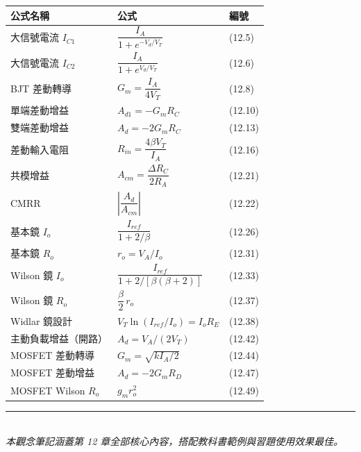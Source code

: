 \documentclass[12pt]{article}
\begin{document}
\begin{center}\small
\renewcommand{\arraystretch}{1.6}
\begin{tabular}{p{5.0cm}|l|l}
\toprule
\textbf{公式名稱} & \textbf{公式} & \textbf{編號} \\
\midrule
大信號電流 $I_{C1}$ & $\dfrac{I_A}{1+e^{-V_d/V_T}}$ & (12.5) \\[4pt]
大信號電流 $I_{C2}$ & $\dfrac{I_A}{1+e^{V_d/V_T}}$ & (12.6) \\[4pt]
BJT 差動轉導 & $G_m = \dfrac{I_A}{4V_T}$ & (12.8) \\[4pt]
單端差動增益 & $A_{d1} = -G_m R_C$ & (12.10) \\[4pt]
雙端差動增益 & $A_d = -2G_m R_C$ & (12.13) \\[4pt]
差動輸入電阻 & $R_{in} = \dfrac{4\beta V_T}{I_A}$ & (12.16) \\[4pt]
共模增益 & $A_{cm} = \dfrac{\Delta R_C}{2R_A}$ & (12.21) \\[4pt]
CMRR & $\left|\dfrac{A_d}{A_{cm}}\right|$ & (12.22) \\[4pt]
基本鏡 $I_o$ & $\dfrac{I_{ref}}{1+2/\beta}$ & (12.26) \\[4pt]
基本鏡 $R_o$ & $r_o = V_A/I_o$ & (12.31) \\[4pt]
Wilson 鏡 $I_o$ & $\dfrac{I_{ref}}{1+2/[\beta(\beta+2)]}$ & (12.33) \\[4pt]
Wilson 鏡 $R_o$ & $\dfrac{\beta}{2}\,r_o$ & (12.37) \\[4pt]
Widlar 鏡設計 & $V_T\ln(I_{ref}/I_o) = I_o R_E$ & (12.38) \\[4pt]
主動負載增益（開路） & $A_d = V_A/(2V_T)$ & (12.42) \\[4pt]
MOSFET 差動轉導 & $G_m = \sqrt{kI_A/2}$ & (12.44) \\[4pt]
MOSFET 差動增益 & $A_d = -2G_m R_D$ & (12.47) \\[4pt]
MOSFET Wilson $R_o$ & $g_m r_o^2$ & (12.49) \\
\bottomrule
\end{tabular}
\end{center}

\vfill
\begin{center}
\small\color{maincol}\rule{0.6\textwidth}{0.4pt}\\[4pt]
{\itshape 本觀念筆記涵蓋第 12 章全部核心內容，搭配教科書範例與習題使用效果最佳。}
\end{center}
\end{document}

